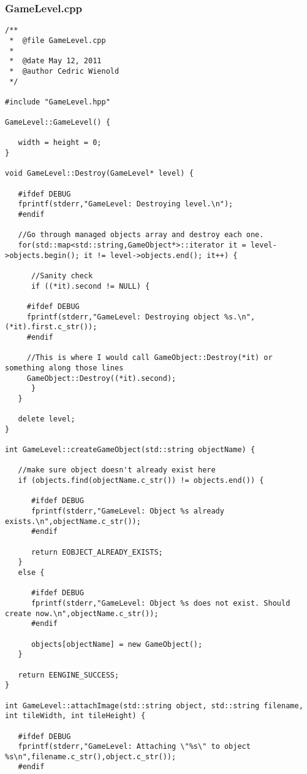 \documentclass[12pt]{article}
\begin{document}
\subsubsection{GameLevel.cpp}
\begin{lstlisting}[breaklines]
/**
 *  @file GameLevel.cpp
 *
 *  @date May 12, 2011
 *  @author Cedric Wienold
 */

#include "GameLevel.hpp"

GameLevel::GameLevel() {
   
   width = height = 0;
}

void GameLevel::Destroy(GameLevel* level) {

   #ifdef DEBUG
   fprintf(stderr,"GameLevel: Destroying level.\n");
   #endif
   
   //Go through managed objects array and destroy each one.
   for(std::map<std::string,GameObject*>::iterator it = level->objects.begin(); it != level->objects.end(); it++) {
      
      //Sanity check
      if ((*it).second != NULL) {
	 
	 #ifdef DEBUG
	 fprintf(stderr,"GameLevel: Destroying object %s.\n",(*it).first.c_str());
	 #endif
   
	 //This is where I would call GameObject::Destroy(*it) or something along those lines
	 GameObject::Destroy((*it).second);
      }
   }
   
   delete level;
}

int GameLevel::createGameObject(std::string objectName) {

   //make sure object doesn't already exist here
   if (objects.find(objectName.c_str()) != objects.end()) {
      
      #ifdef DEBUG
      fprintf(stderr,"GameLevel: Object %s already exists.\n",objectName.c_str());
      #endif
      
      return EOBJECT_ALREADY_EXISTS;
   }
   else {

      #ifdef DEBUG
      fprintf(stderr,"GameLevel: Object %s does not exist. Should create now.\n",objectName.c_str());
      #endif
      
      objects[objectName] = new GameObject();
   }
   
   return EENGINE_SUCCESS;
}

int GameLevel::attachImage(std::string object, std::string filename, int tileWidth, int tileHeight) {
   
   #ifdef DEBUG
   fprintf(stderr,"GameLevel: Attaching \"%s\" to object %s\n",filename.c_str(),object.c_str());
   #endif
   

\end{lstlisting}
\end{document}
